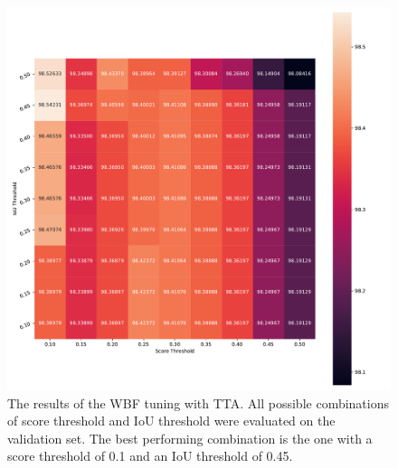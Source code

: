 \begin{figure}[H]
\begin{center}
    \includegraphics[width=\columnwidth]{imgs/yolo_wbf_tta_heat.pdf}
    \caption{The results of the \ac{WBF} tuning with \ac{TTA}. All possible combinations of score threshold and \ac{IoU} threshold were evaluated on the validation set. The best performing combination is the one with a score threshold of 0.1 and an \ac{IoU} threshold of 0.45.}
    \label{fig:wbf_tta_nms_tuning}
\end{center}
\end{figure}
